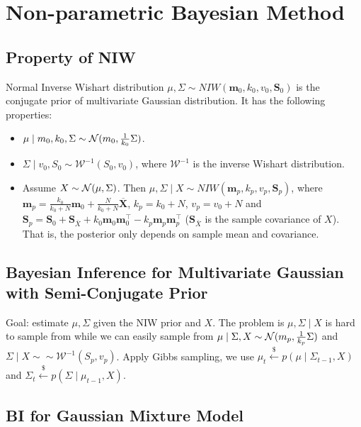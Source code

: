 \section{Non-parametric Bayesian Method}

\subsection*{Property of NIW}

Normal Inverse Wishart distribution $\mu, \Sigma \sim NIW(\boldsymbol{m}_0, k_0, v_0, \boldsymbol{S}_0)$ is the conjugate prior of multivariate Gaussian distribution. It has the following properties:
\begin{itemize}
    \item $\mu \mid m_0, k_0, \Sigma \sim \mathcal{N}(m_0, \frac{1}{k_0}\Sigma)$.
    \item $\Sigma \mid v_0, S_0 \sim \mathcal{W}^{-1}(S_0, v_0)$, where $\mathcal{W}^{-1}$ is the inverse Wishart distribution.
    \item Assume $X\sim \mathcal{N}(\mu, \Sigma)$. Then $\mu, \Sigma\mid X \sim NIW(\boldsymbol{m}_p, k_p, v_p, \boldsymbol{S}_p)$, 
    where $\boldsymbol{m}_{p}=\frac{k_{0}}{k_{0}+N} \boldsymbol{m}_{0}+\frac{N}{k_{0}+N} \overline{\boldsymbol{X}}$, $k_p=k_0+N$, $v_p=v_0+N$ and $\boldsymbol{S}_{p}=\boldsymbol{S}_{0}+\boldsymbol{S}_{\bar{X}}+k_{0} \boldsymbol{m}_{0} \boldsymbol{m}_{0}^{\top}-k_{p} \boldsymbol{m}_{p} \boldsymbol{m}_{p}^{\top}$ ($\boldsymbol{S}_{\bar{X}}$ is the sample covariance of $X$). That is, the posterior only depends on sample mean and covariance.
\end{itemize}

\subsection*{Bayesian Inference for Multivariate Gaussian with Semi-Conjugate Prior}

Goal: estimate $\mu, \Sigma$ given the NIW prior and $X$. The problem is $\mu, \Sigma\mid X$ is hard to sample from while we can easily sample from $\mu \mid \Sigma, X \sim \mathcal{N}(m_p, \frac{1}{k_p}\Sigma)$ and $\Sigma \mid X\sim \sim \mathcal{W}^{-1}(S_p, v_p)$. Apply Gibbs sampling, we use $\mu_t \overset{\$}{\leftarrow} p(\mu \mid \Sigma_{t-1}, X)$ and $\Sigma_t \overset{\$} {\leftarrow} p(\Sigma \mid \mu_{t-1}, X)$.

\subsection*{BI for Gaussian Mixture Model}

